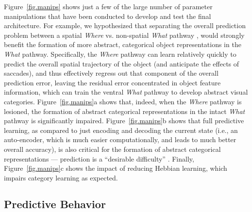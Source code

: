 \documentclass[11pt,twoside]{article}
\newif\myifpdf
\begin{document}
Figure~\ref{fig.manips} shows just a few of the large number of parameter manipulations that have been conducted to develop and test the final architecture.  For example, we hypothesized that separating the overall prediction problem between a spatial \emph{Where} vs. non-spatial \emph{What} pathway \citep{UngerleiderMishkin82,GoodaleMilner92}, would strongly benefit the formation of more abstract, categorical object representations in the \emph{What} pathway.  Specifically, the \emph{Where} pathway can learn relatively quickly to predict the overall spatial trajectory of the object (and anticipate the effects of saccades), and thus effectively regress out that component of the overall prediction error, leaving the residual error concentrated in object feature information, which can train the ventral \emph{What} pathway to develop abstract visual categories.  Figure~\ref{fig.manips}a shows that, indeed, when the \emph{Where} pathway is lesioned, the formation of abstract categorical representations in the intact \emph{What} pathway is significantly impaired.  Figure~\ref{fig.manips}b shows that full predictive learning, as compared to just encoding and decoding the current state (i.e., an auto-encoder, which is much easier computationally, and leads to much better overall accuracy), is also critical for the formation of abstract categorical representations --- prediction is a ``desirable difficulty'' \citep{Bjork94}.  Finally, Figure~\ref{fig.manips}c shows the impact of reducing Hebbian learning, which impairs category learning as expected.

\subsection{Predictive Behavior}
\end{document}
